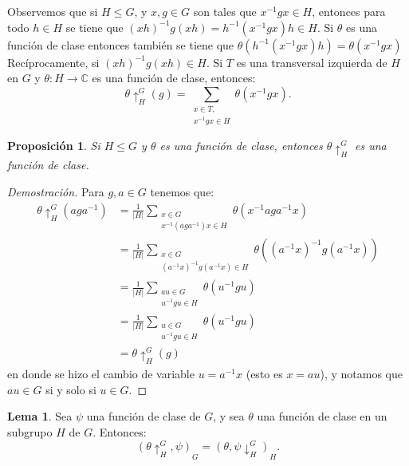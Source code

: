 \documentclass[12pt]{book}
\newtheorem{proposition}[theorem]{Proposición}
\theoremstyle{definition}
\newtheorem{lemma}[theorem]{Lema}
\newcounter{in}
\begin{document}
Observemos que si $H\leq G$, y $x,g\in G$ son tales que
$x^{-1}gx\in H$, entonces para todo $h\in H$ se tiene que
$(xh)^{-1}g(xh)=h^{-1}(x^{-1}gx)h\in H$. Si $\theta$ es una función de
clase entonces también se tiene que
$\theta(h^{-1}(x^{-1}gx)h)=\theta(x^{-1}gx)$ Recíprocamente, si
$(xh)^{-1}g(xh)\in H$. Si $T$ es una transversal izquierda de $H$ en
$G$ y $\theta:H\rightarrow\mathbb{C}$ es una función de clase,
entonces:
\begin{equation}
  \label{fun-ind-trans}
  \theta\uparrow^{G}_{H}(g)=\sum_{\substack{x\in T,\\x^{-1}gx\in H}}\theta(x^{-1}gx).
\end{equation}
\begin{proposition}
  Si $H\leq G$ y $\theta$ es una función de
  clase, entonces $\theta\uparrow^{G}_{H}$ es
  una función de clase. 
\end{proposition}
\begin{proof}[Demostración]
  Para $g,a\in G$ tenemos que:
  \begin{align*}
    \theta\uparrow^{G}_{H}(aga^{-1})&=\frac{1}{|H|}\sum_{\substack{x\in
        G\\x^{-1}(aga^{-1})x\in H}}\theta(x^{-1}aga^{-1}x)\\
    &=\frac{1}{|H|}\sum_{\substack{x\in
        G\\(a^{-1}x)^{-1}g(a^{-1}x)\in H}}\theta((a^{-1}x)^{-1}g(a^{-1}x))\\
    &=\frac{1}{|H|}\sum_{\substack{au\in
        G\\u^{-1}gu\in H}}\theta(u^{-1}gu)\\
     &=\frac{1}{|H|}\sum_{\substack{u\in
        G\\u^{-1}gu\in H}}\theta(u^{-1}gu)\\
    &=\theta\uparrow^{G}_{H}(g)
  \end{align*}
en donde se hizo el cambio de variable $u=a^{-1}x$ (esto es $x=au$), y notamos
que $au\in G$ si y solo si $u\in G$.
\end{proof}
\begin{lemma}
  \label{l5_1}
  Sea $\psi$ una función de clase de $G$, y sea $\theta$ una función
  de clase en un subgrupo $H$ de $G$. Entonces:
  \begin{equation*}
    (\theta \uparrow^{G}_{H},\psi)_{G}= (\theta,\psi\downarrow^{G}_{H})_{H} .
  \end{equation*}
\end{lemma} 
\end{document}
